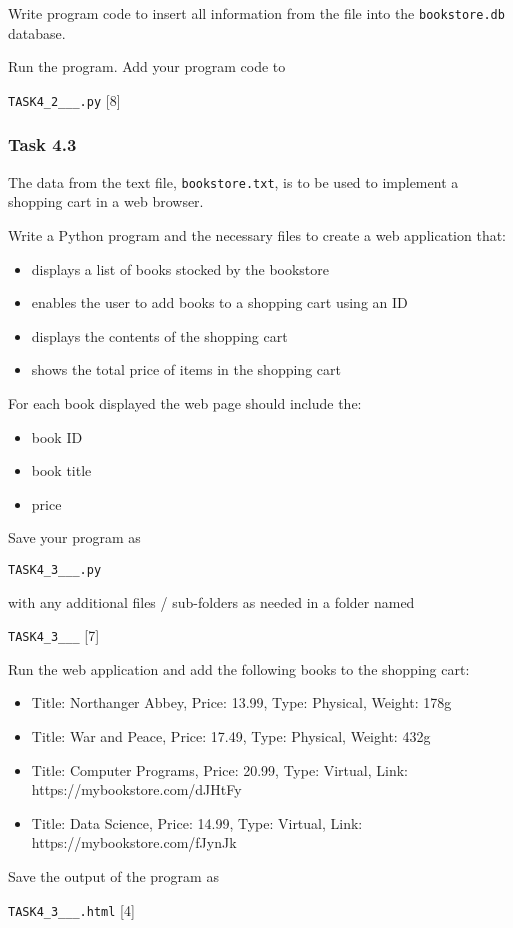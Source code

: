 Write program code to insert all information from the file into the
\texttt{bookstore.db} database.

Run the program. Add your program code to 

\texttt{TASK4\_2\_<your name>\_<centre number>\_<index number>.py}
\hfill{}{[}8{]}

\subsubsection*{Task 4.3 }

The data from the text file, \texttt{bookstore.txt}, is to be used
to implement a shopping cart in a web browser. 

Write a Python program and the necessary files to create a web application
that: 
\begin{itemize}
\item displays a list of books stocked by the bookstore 
\item enables the user to add books to a shopping cart using an ID 
\item displays the contents of the shopping cart
\item shows the total price of items in the shopping cart 
\end{itemize}
For each book displayed the web page should include the: 
\begin{itemize}
\item book ID 
\item book title 
\item price 
\end{itemize}
Save your program as 

\texttt{TASK4\_3\_<your name>\_<centre number>\_<index number>.py }

with any additional files / sub-folders as needed in a folder named 

\texttt{TASK4\_3\_<your name>\_<centre number>\_<index number>}\hfill{}
{[}7{]}

Run the web application and add the following books to the shopping
cart: 
\begin{itemize}
\item Title: \textquotedbl Northanger Abbey\textquotedbl , Price: 13.99,
Type: Physical, Weight: 178g 
\item Title: \textquotedbl War and Peace\textquotedbl , Price: 17.49,
Type: Physical, Weight: 432g 
\item Title: \textquotedbl Computer Programs\textquotedbl , Price: 20.99,
Type: Virtual, Link: https://mybookstore.com/dJHtFy 
\item Title: \textquotedbl Data Science\textquotedbl , Price: 14.99, Type:
Virtual, Link: https://mybookstore.com/fJynJk 
\end{itemize}
Save the output of the program as

\texttt{TASK4\_3\_<your name>\_<centre number>\_<index number>.html}
\hfill{}{[}4{]}